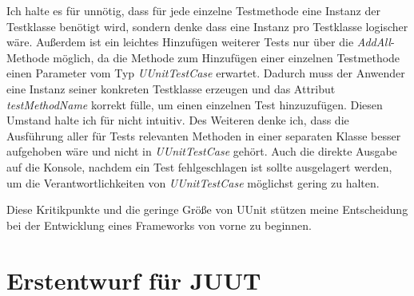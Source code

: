 Ich halte es für unnötig, dass für jede einzelne Testmethode eine Instanz der Testklasse benötigt wird, sondern denke dass eine Instanz pro Testklasse logischer wäre. Außerdem ist ein leichtes Hinzufügen weiterer Tests nur über die \textit{AddAll}-Methode möglich, da die Methode zum Hinzufügen einer einzelnen Testmethode einen Parameter vom Typ \textit{UUnitTestCase} erwartet. Dadurch muss der Anwender eine Instanz seiner konkreten Testklasse erzeugen und das Attribut \textit{testMethodName} korrekt fülle, um einen einzelnen Test hinzuzufügen. Diesen Umstand halte ich für nicht intuitiv. Des Weiteren denke ich, dass die Ausführung aller für Tests relevanten Methoden in einer separaten Klasse besser aufgehoben wäre und nicht in \textit{UUnitTestCase} gehört. Auch die direkte Ausgabe auf die Konsole, nachdem ein Test fehlgeschlagen ist sollte ausgelagert werden, um die Verantwortlichkeiten von \textit{UUnitTestCase} möglichst gering zu halten.

Diese Kritikpunkte und die geringe Größe von UUnit stützen meine Entscheidung bei der Entwicklung eines Frameworks von vorne zu beginnen.

\section{Erstentwurf für JUUT}